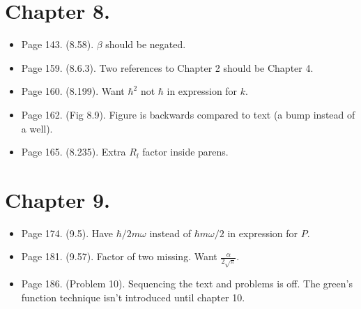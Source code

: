 \section{Chapter 8.}
\begin{itemize}
\item Page 143.  (8.58).  $\beta$ should be negated.
\item Page 159.  (8.6.3).  Two references to Chapter 2 should be Chapter 4.
\item Page 160.  (8.199).  Want $\hbar^2$ not $\hbar$ in expression for $k$.
\item Page 162.  (Fig 8.9).  Figure is backwards compared to text (a bump instead of a well).
\item Page 165.  (8.235).  Extra $R_l$ factor inside parens.
\end{itemize}

\section{Chapter 9.}
\begin{itemize}
\item Page 174.  (9.5).  Have $\hbar/2m\omega$ instead of $\hbar m \omega/2$ in expression for $P$.
\item Page 181.  (9.57).  Factor of two missing.  Want $\frac{\alpha}{2 \sqrt{\pi}}$.
\item Page 186.  (Problem 10).  Sequencing the text and problems is off.  The green's function technique isn't introduced until chapter 10.
\end{itemize}

